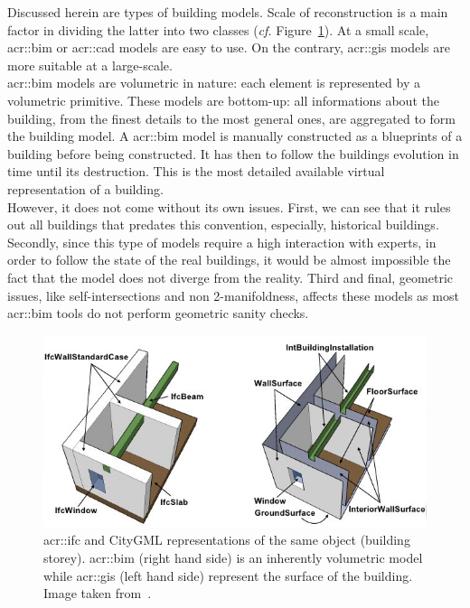             Discussed herein are types of building models.
            Scale of reconstruction is a main factor in dividing the latter into two classes (\textit{cf.} Figure~\ref{fig::bim_vs_gis}).
            At a small scale, \gls{acr::bim} or \gls{acr::cad} models are easy to use.
            On the contrary, \gls{acr::gis} models are more suitable at a large-scale.\\

            \gls{acr::bim} models are volumetric in nature:
            each element is represented by a volumetric primitive.
            These models are bottom-up: all informations about the building, from the finest details to the most general ones, are aggregated to form the building model.
            A \gls{acr::bim} model is manually constructed as a blueprints of a building before being constructed.
            It has then to follow the buildings evolution in time until its destruction.
            This is the most detailed available virtual representation of a building.\\
            However, it does not come without its own issues.
            First, we can see that it rules out all buildings that predates this convention, especially, historical buildings.
            Secondly, since this type of models require a high interaction with experts, in order to follow the state of the real buildings, it would be almost impossible the fact that the model does not diverge from the reality\addref.
            Third and final, geometric issues, like self-intersections and non 2-manifoldness, affects these models as most \gls{acr::bim} tools do not perform geometric sanity checks.\\

            \begin{figure}[htpb]
                \centering
                \includegraphics[width=\textwidth]{images/introduction/bim_vs_gis}            
                \caption[
                    \acrshort*{acr::ifc} and CityGML representations of the same object (building storey).
                ]{
                    \label{fig::bim_vs_gis}
                    \gls{acr::ifc} and CityGML representations of the same object (building storey).
                    \gls{acr::bim} (right hand side) is an inherently volumetric model while \gls{acr::gis} (left hand side) represent the surface of the building.
                    Image taken from~\parencite{nagel2009conceptual}.
                }
            \end{figure}

